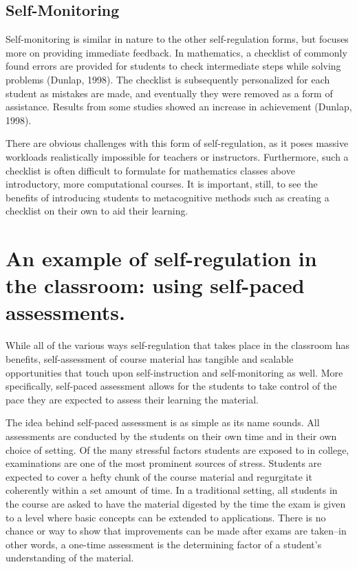 \subsection{Self-Monitoring}
Self-monitoring is similar in nature to the other self-regulation forms, but focuses more on providing immediate feedback. In mathematics, a checklist of commonly found errors are provided for students to check intermediate steps while solving problems (Dunlap, 1998). The checklist is subsequently personalized for each student as mistakes are made, and eventually they were removed as a form of assistance. Results from some studies showed an increase in achievement (Dunlap, 1998).

There are obvious challenges with this form of self-regulation, as it  poses massive workloads realistically impossible for teachers or instructors. Furthermore, such a checklist is often difficult to formulate for mathematics classes above introductory, more computational courses. It is important, still, to see the benefits of introducing students to metacognitive methods such as creating a checklist on their own to aid their learning.

\section{An example of self-regulation in the classroom: using self-paced assessments.}
While all of the various ways self-regulation that takes place in the classroom has benefits, self-assessment of course material has tangible and scalable opportunities that touch upon self-instruction and self-monitoring as well. More specifically, self-paced assessment allows for the students to take control of the pace they are expected to assess their learning the material.

The idea behind self-paced assessment is as simple as its name sounds. All assessments are conducted by the students on their own time and in their own choice of setting. Of the many stressful factors students are exposed to in college, examinations are one of the most prominent sources of stress. Students are expected to cover a hefty chunk of the course material and regurgitate it coherently within a set amount of time. In a traditional setting, all students in the course are asked to have the material digested by the time the exam is given to a level where basic concepts can be extended to applications. There is no chance or way to show that improvements can be made after exams are taken--in other words, a one-time assessment is the determining factor of a student's understanding of the material.

